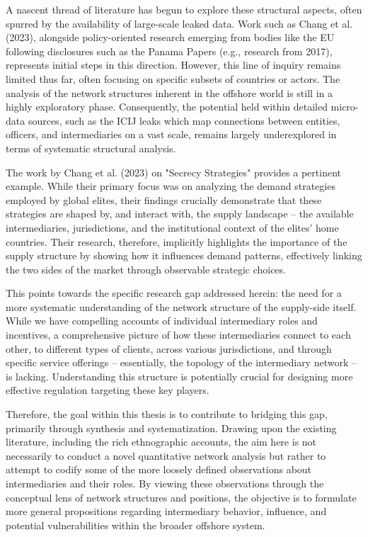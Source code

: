 A nascent thread of literature has begun to explore these structural aspects, often spurred by the availability of large-scale leaked data. Work such as Chang et al. (2023), alongside policy-oriented research emerging from bodies like the EU following disclosures such as the Panama Papers (e.g., research from 2017), represents initial steps in this direction. However, this line of inquiry remains limited thus far, often focusing on specific subsets of countries or actors. The analysis of the network structures inherent in the offshore world is still in a highly exploratory phase. Consequently, the potential held within detailed micro-data sources, such as the ICIJ leaks which map connections between entities, officers, and intermediaries on a vast scale, remains largely underexplored in terms of systematic structural analysis.

The work by Chang et al. (2023) on "Secrecy Strategies" provides a pertinent example. While their primary focus was on analyzing the demand strategies employed by global elites, their findings crucially demonstrate that these strategies are shaped by, and interact with, the supply landscape – the available intermediaries, jurisdictions, and the institutional context of the elites' home countries. Their research, therefore, implicitly highlights the importance of the supply structure by showing how it influences demand patterns, effectively linking the two sides of the market through observable strategic choices.

This points towards the specific research gap addressed herein: the need for a more systematic understanding of the network structure of the supply-side itself. While we have compelling accounts of individual intermediary roles and incentives, a comprehensive picture of how these intermediaries connect to each other, to different types of clients, across various jurisdictions, and through specific service offerings – essentially, the topology of the intermediary network – is lacking. Understanding this structure is potentially crucial for designing more effective regulation targeting these key players.

Therefore, the goal within this thesis is to contribute to bridging this gap, primarily through synthesis and systematization. Drawing upon the existing literature, including the rich ethnographic accounts, the aim here is not necessarily to conduct a novel quantitative network analysis but rather to attempt to codify some of the more loosely defined observations about intermediaries and their roles. By viewing these observations through the conceptual lens of network structures and positions, the objective is to formulate more general propositions regarding intermediary behavior, influence, and potential vulnerabilities within the broader offshore system. 

